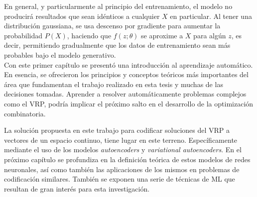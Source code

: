  En general, y particularmente al principio del entrenamiento, el modelo no producirá resultados que sean idénticos a cualquier $X$ en particular. Al tener una distribución gaussiana, se usa descenso por gradiente para aumentar la probabilidad $P(X)$, haciendo que $f(z; \theta)$ se aproxime a $X$ para algún $z$, es decir, permitiendo gradualmente que los datos de entrenamiento sean más probables bajo el modelo generativo.\\
 
 Con este primer capítulo se presentó una introducción al aprendizaje automático. En esencia, se ofrecieron los principios y conceptos teóricos más importantes del área que fundamentan el trabajo realizado en esta tesis y muchas de las decisiones tomadas. Aprender a resolver automáticamente problemas complejos como el VRP, podría implicar el próximo salto en el desarrollo de la optimización combinatoria.  
 
 La solución propuesta en este trabajo para codificar soluciones del VRP a vectores de un espacio continuo, tiene lugar en este terreno. Específicamente mediante el uso de los modelos \textit{autoencoders} y \textit{variational autoencoders}. En el próximo capítulo se profundiza en la definición teórica de estos modelos de redes neuronales, así como también las aplicaciones de los mismos en problemas de codificación similares. También se exponen una serie de técnicas de ML que resultan de gran interés para esta investigación. 
 
 
 
 
 




 

